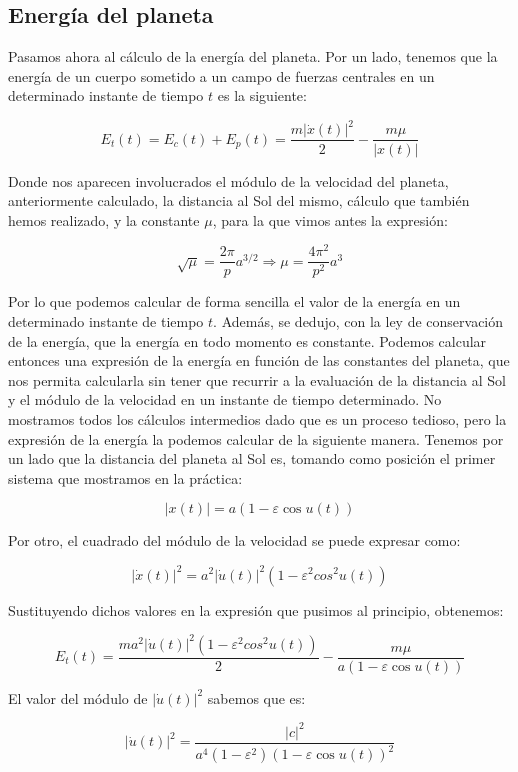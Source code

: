 \documentclass[12pt]{article}
\begin{document}
\subsection{Energía del planeta}

Pasamos ahora al cálculo de la energía del planeta. Por un lado,
tenemos que la energía de un cuerpo sometido a un campo de fuerzas
centrales en un determinado instante de tiempo $t$ es la siguiente:

\[
E_{t}(t) = E_{c}(t) + E_{p}(t) = \frac{m|\dot{x}(t)|^2}{2} -
\frac{m\mu}{|x(t)|}
\]

Donde nos aparecen involucrados el módulo de la velocidad del planeta,
anteriormente calculado, la distancia al Sol del mismo, cálculo que
también hemos realizado, y la constante $\mu$, para la que vimos antes
la expresión:

\[
\sqrt{\mu} = \frac{2\pi}{p}a^{3/2} \Rightarrow \mu = \frac{4
  \pi^2}{p^2}a^3
\]

Por lo que podemos calcular de forma sencilla el valor de la energía
en un determinado instante de tiempo $t$. Además, se dedujo, con la
ley de conservación de la energía, que la energía en todo momento es
constante. Podemos calcular entonces una expresión de la energía en
función de las constantes del planeta, que nos permita calcularla sin
tener que recurrir a la evaluación de la distancia al Sol y el módulo
de la velocidad en un instante de tiempo determinado. No mostramos
todos los cálculos intermedios dado que es un proceso tedioso, pero la
expresión de la energía la podemos calcular de la siguiente
manera. Tenemos por un lado que la distancia del planeta al Sol es,
tomando como posición el primer sistema que mostramos en la práctica:

\[
|x(t)| = a(1 - \varepsilon \cos{u(t)})
\]

Por otro, el cuadrado del módulo de la velocidad se puede expresar
como:

\[
|\dot{x}(t)|^2 = a^2|\dot{u}(t)|^2(1-\varepsilon^2cos^2{u(t)})
\]

Sustituyendo dichos valores en la expresión que pusimos al principio,
obtenemos:

\[
E_{t}(t) = \frac{ma^2|\dot{u}(t)|^2(1-\varepsilon^2cos^2{u(t)})}{2} -
\frac{m\mu}{a(1 - \varepsilon \cos{u(t)})}
\]

El valor del módulo de $|\dot{u}(t)|^2$ sabemos que es:

\[
|\dot{u}(t)|^2 = \frac{|c|^2}{a^4(1-\varepsilon^2)(1 - \varepsilon
  \cos{u(t)})^2}
\]
\end{document}
